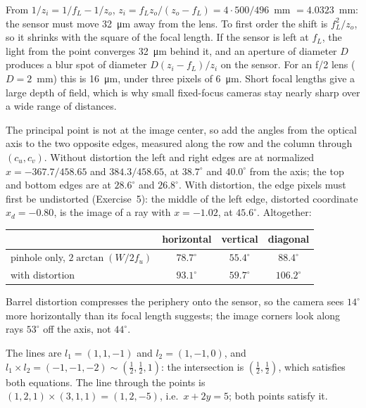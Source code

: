 \begin{solutions}
  \item From $1/z_i = 1/f_L - 1/z_o$, $z_i = f_Lz_o/(z_o - f_L) = 4\cdot500/496$~mm $= 4.0323$~mm: the sensor must move \SI{32}{\micro\metre} away from the lens.
        To first order the shift is $f_L^2/z_o$, so it shrinks with the square of the focal length. If the sensor is left at $f_L$, the light from the point
        converges \SI{32}{\micro\metre} behind it, and an aperture of diameter $D$ produces a blur spot of diameter $D(z_i - f_L)/z_i$ on the sensor. For an f/2
        lens ($D = 2$~mm) this is \SI{16}{\micro\metre}, under three pixels of \SI{6}{\micro\metre}. Short focal lengths give a large depth of field, which is why small
        fixed-focus cameras stay nearly sharp over a wide range of distances.

  \item The principal point is not at the image center, so add the angles from the optical axis to the two opposite edges, measured along the row and
        the column through $(c_u, c_v)$. Without distortion the left and right edges are at normalized $x = -367.7/458.65$ and $384.3/458.65$, at
        $38.7^\circ$ and $40.0^\circ$ from the axis; the top and bottom edges are at $28.6^\circ$ and $26.8^\circ$. With distortion, the edge pixels must first be
        undistorted (Exercise~5): the middle of the left edge, distorted coordinate $x_d = -0.80$, is the image of a ray with $x = -1.02$, at $45.6^\circ$. Altogether:
        \begin{center}\small
        \begin{tabular}{@{}l c c c@{}}
        \toprule
        & horizontal & vertical & diagonal \\
        \midrule
        pinhole only, $2\arctan(W/2f_u)$ & $78.7^\circ$ & $55.4^\circ$ & $88.4^\circ$ \\
        with distortion & $93.1^\circ$ & $59.7^\circ$ & $106.2^\circ$ \\
        \bottomrule
        \end{tabular}
        \end{center}
        Barrel distortion compresses the periphery onto the sensor, so the camera sees $14^\circ$ more horizontally than its focal length suggests; the image
        corners look along rays $53^\circ$ off the axis, not $44^\circ$.

  \item The lines are $l_1 = (1, 1, -1)$ and $l_2 = (1, -1, 0)$, and $l_1\times l_2 = (-1, -1, -2) \sim (\tfrac12, \tfrac12, 1)$: the intersection is $(\tfrac12, \tfrac12)$, which
        satisfies both equations. The line through the points is $(1, 2, 1)\times(3, 1, 1) = (1, 2, -5)$, i.e.\ $x + 2y = 5$; both points satisfy it.


\end{solutions}
